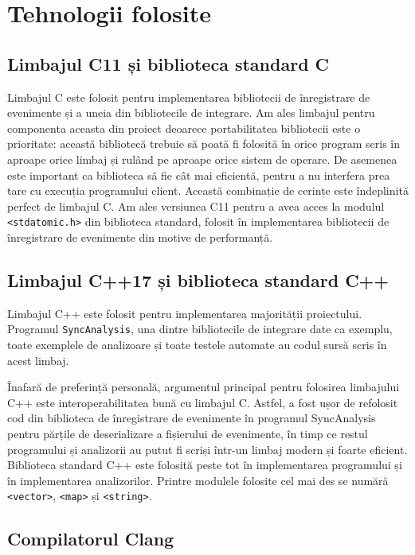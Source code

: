 \section{Tehnologii folosite}

\subsection{Limbajul C11 și biblioteca standard C}

Limbajul C\cite{C} este folosit pentru implementarea bibliotecii de
înregistrare de evenimente și a uneia din bibliotecile de integrare.
Am ales limbajul pentru componenta aceasta din proiect deoarece
portabilitatea bibliotecii este o prioritate: această bibliotecă trebuie
să poată fi folosită în orice program scris în aproape orice limbaj și
rulând pe aproape orice sistem de operare. De asemenea este important ca
biblioteca să fie cât mai eficientă, pentru a nu interfera prea tare cu
execuția programului client. Această combinație de cerințe este
îndeplinită perfect de limbajul C. Am ales versiunea C11 pentru a avea
acces la modulul \lstinline{<stdatomic.h>} din biblioteca standard,
folosit în implementarea bibliotecii de înregistrare de evenimente din
motive de performanță.

\subsection{Limbajul C++17 și biblioteca standard C++}

Limbajul C++\cite{CXX} este folosit pentru implementarea majorității
proiectului. Programul \lstinline{SyncAnalysis}, una dintre bibliotecile
de integrare date ca exemplu, toate exemplele de analizoare și toate
testele automate au codul sursă scris în acest limbaj.

Înafară de preferință personală, argumentul principal pentru folosirea
limbajului C++ este interoperabilitatea bună cu limbajul C. Astfel, a
fost ușor de refolosit cod din biblioteca de înregistrare de evenimente
în programul SyncAnalysis pentru părțile de deserializare a fișierului
de evenimente, în timp ce restul programului și analizorii au putut fi
scriși într-un limbaj modern și foarte eficient. Biblioteca standard C++
este folosită peste tot în implementarea programului și în implementarea
analizorilor. Printre modulele folosite cel mai des se numără
\lstinline{<vector>}, \lstinline{<map>} și \lstinline{<string>}.

\subsection{Compilatorul Clang}

